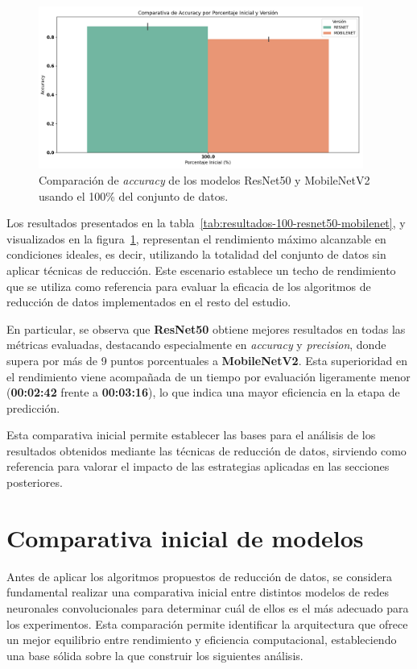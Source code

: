 \begin{figure}[htp]
    \centering
    \includegraphics[width=0.95\textwidth]{imagenes/evaluaciones/comparacion_modelos_100.png}
    \caption{Comparación de \textit{accuracy} de los modelos ResNet50 y MobileNetV2 usando el 100\% del conjunto de datos.}
    \label{fig:comparacion_modelos_100}
\end{figure}

Los resultados presentados en la tabla~\ref{tab:resultados-100-resnet50-mobilenet}, y visualizados en la figura~\ref{fig:comparacion_modelos_100},
representan el rendimiento máximo alcanzable en condiciones ideales,
es decir, utilizando la totalidad del conjunto de datos sin aplicar técnicas de reducción.
Este escenario establece un techo de rendimiento que se utiliza como referencia para evaluar la eficacia de
los algoritmos de reducción de datos implementados en el resto del estudio.

En particular, se observa que \textbf{ResNet50} obtiene mejores resultados en todas las métricas evaluadas,
destacando especialmente en \textit{accuracy} y \textit{precision}, donde supera por más de 9 puntos porcentuales a \textbf{MobileNetV2}.
Esta superioridad en el rendimiento viene acompañada de un tiempo por evaluación ligeramente menor (\textbf{00:02:42} frente a \textbf{00:03:16}),
lo que indica una mayor eficiencia en la etapa de predicción.

Esta comparativa inicial permite establecer las bases para el análisis de los resultados obtenidos mediante las técnicas de reducción de datos,
sirviendo como referencia para valorar el impacto de las estrategias aplicadas en las secciones posteriores.


\section{Comparativa inicial de modelos}\label{sec:comparativa-inicial-modelos}
Antes de aplicar los algoritmos propuestos de reducción de datos, se considera fundamental realizar una comparativa inicial entre distintos
modelos de redes neuronales convolucionales para determinar cuál de ellos es el más adecuado para los experimentos.
Esta comparación permite identificar la arquitectura que ofrece un mejor equilibrio entre rendimiento y eficiencia computacional,
estableciendo una base sólida sobre la que construir los siguientes análisis.

